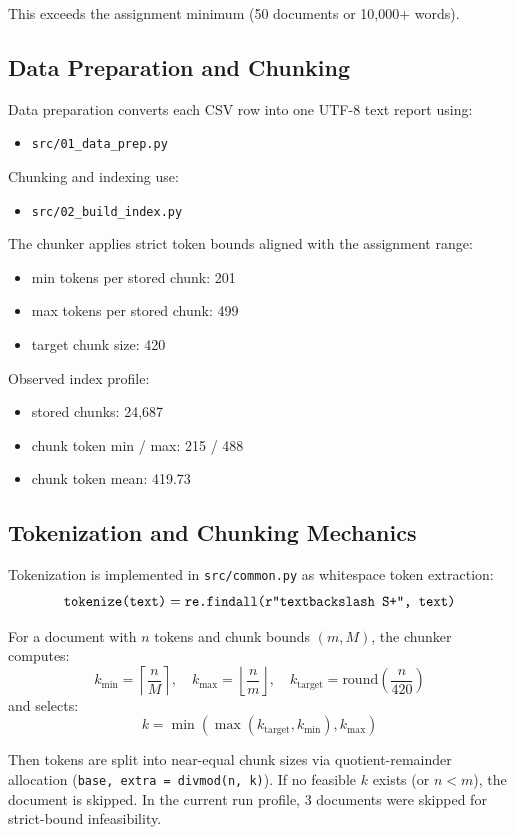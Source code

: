 \documentclass[11pt]{article}
\newcommand{\chunkCount}{24{,}687}
\newcommand{\chunkMin}{215}
\newcommand{\chunkMax}{488}
\newcommand{\chunkMean}{419.73}
\begin{document}
This exceeds the assignment minimum (50 documents or 10,000+ words).

\subsection{Data Preparation and Chunking}
Data preparation converts each CSV row into one UTF-8 text report using:
\begin{itemize}
    \item \texttt{src/01\_data\_prep.py}
\end{itemize}

Chunking and indexing use:
\begin{itemize}
    \item \texttt{src/02\_build\_index.py}
\end{itemize}

The chunker applies strict token bounds aligned with the assignment range:
\begin{itemize}
    \item min tokens per stored chunk: 201
    \item max tokens per stored chunk: 499
    \item target chunk size: 420
\end{itemize}

Observed index profile:
\begin{itemize}
    \item stored chunks: \chunkCount
    \item chunk token min / max: \chunkMin{} / \chunkMax
    \item chunk token mean: \chunkMean
\end{itemize}

\subsection{Tokenization and Chunking Mechanics}
Tokenization is implemented in \texttt{src/common.py} as whitespace token extraction:
\[
\texttt{tokenize(text)} = \texttt{re.findall(r"\\textbackslash S+", text)}
\]

For a document with \(n\) tokens and chunk bounds \((m, M)\), the chunker computes:
\[
k_{\min}=\left\lceil\frac{n}{M}\right\rceil,\quad
k_{\max}=\left\lfloor\frac{n}{m}\right\rfloor,\quad
k_{\text{target}}=\text{round}\left(\frac{n}{420}\right)
\]
and selects:
\[
k=\min\left(\max(k_{\text{target}},k_{\min}),k_{\max}\right)
\]

Then tokens are split into near-equal chunk sizes via quotient-remainder allocation (\texttt{base, extra = divmod(n, k)}). If no feasible \(k\) exists (or \(n < m\)), the document is skipped. In the current run profile, 3 documents were skipped for strict-bound infeasibility.
\end{document}
